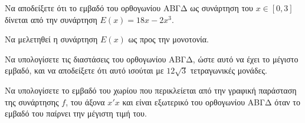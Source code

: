 \begin{alist}
\item Να αποδείξετε ότι το εμβαδό του ορθογωνίου ΑΒΓΔ ως συνάρτηση του $x \in [0,3]$ δίνεται από την συνάρτηση $E(x) = 18x - 2x^3$. 
\item Να μελετηθεί η συνάρτηση $E(x)$ ως προς την μονοτονία. 
\item Να υπολογίσετε τις διαστάσεις του ορθογωνίου ΑΒΓΔ, ώστε αυτό να έχει το μέγιστο εμβαδό, και να αποδείξετε ότι αυτό ισούται με $12\sqrt{3}$ τετραγωνικές μονάδες. 
\item Να υπολογίσετε το εμβαδό του χωρίου που περικλείεται από την γραφική παράσταση της συνάρτησης $f$, του άξονα $x'x$ και είναι εξωτερικό του ορθογωνίου ΑΒΓΔ όταν το εμβαδό του παίρνει την μέγιστη τιμή του. 
\end{alist}
